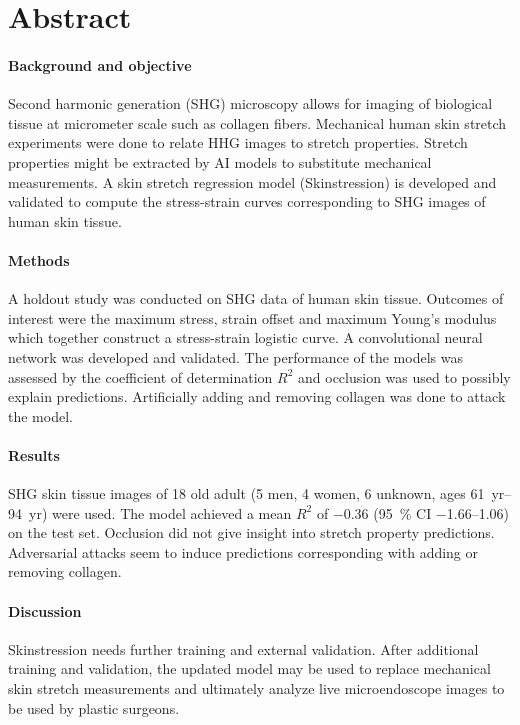 \section*{Abstract}

\paragraph{Background and objective}
Second harmonic generation (SHG) microscopy allows for imaging of biological tissue at micrometer scale such as collagen fibers.
Mechanical human skin stretch experiments were done to relate HHG images to stretch properties.
Stretch properties might be extracted by AI models to substitute mechanical measurements.
A skin stretch regression model (Skinstression) is developed and validated to compute the stress-strain curves corresponding to SHG images of human skin tissue.

\paragraph{Methods}
A holdout study was conducted on SHG data of human skin tissue.
Outcomes of interest were the maximum stress, strain offset and maximum Young's modulus which together construct a stress-strain logistic curve.
A convolutional neural network was developed and validated.
The performance of the models was assessed by the coefficient of determination $R^2$ and occlusion was used to possibly explain predictions.
Artificially adding and removing collagen was done to attack the model.

\paragraph{Results}
SHG skin tissue images of 18 old adult (5 men, 4 women, 6 unknown, ages \qtyrange{61}{94}{yr}) were used.
The model achieved a mean $R^2$ of \num{-0.36} (\qty{95}{\percent} CI \numrange{-1.66}{1.06}) on the test set.
Occlusion did not give insight into stretch property predictions.
Adversarial attacks seem to induce predictions corresponding with adding or removing collagen.

\paragraph{Discussion}
Skinstression needs further training and external validation.
After additional training and validation, the updated model may be used to replace mechanical skin stretch measurements and ultimately analyze live microendoscope images to be used by plastic surgeons.

